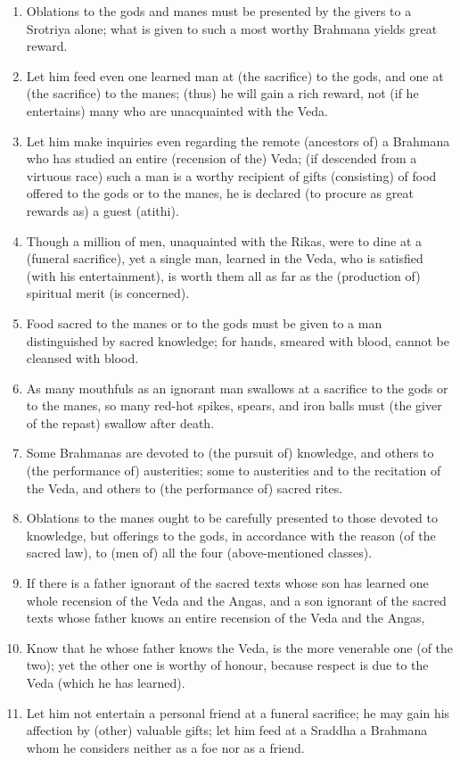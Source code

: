 \begin{enumerate}
\item Oblations to the gods and manes must be presented by the givers to a Srotriya alone; what is given to such a most worthy Brahmana yields great reward.
\item Let him feed even one learned man at (the sacrifice) to the gods, and one at (the sacrifice) to the manes; (thus) he will gain a rich reward, not (if he entertains) many who are unacquainted with the Veda.
\item Let him make inquiries even regarding the remote (ancestors of) a Brahmana who has studied an entire (recension of the) Veda; (if descended from a virtuous race) such a man is a worthy recipient of gifts (consisting) of food offered to the gods or to the manes, he is declared (to procure as great rewards as) a guest (atithi).
\item Though a million of men, unaquainted with the Rikas, were to dine at a (funeral sacrifice), yet a single man, learned in the Veda, who is satisfied (with his entertainment), is worth them all as far as the (production of) spiritual merit (is concerned).
\item Food sacred to the manes or to the gods must be given to a man distinguished by sacred knowledge; for hands, smeared with blood, cannot be cleansed with blood.
\item As many mouthfuls as an ignorant man swallows at a sacrifice to the gods or to the manes, so many red-hot spikes, spears, and iron balls must (the giver of the repast) swallow after death.
\item Some Brahmanas are devoted to (the pursuit of) knowledge, and others to (the performance of) austerities; some to austerities and to the recitation of the Veda, and others to (the performance of) sacred rites.
\item Oblations to the manes ought to be carefully presented to those devoted to knowledge, but offerings to the gods, in accordance with the reason (of the sacred law), to (men of) all the four (above-mentioned classes).
\item If there is a father ignorant of the sacred texts whose son has learned one whole recension of the Veda and the Angas, and a son ignorant of the sacred texts whose father knows an entire recension of the Veda and the Angas,
\item Know that he whose father knows the Veda, is the more venerable one (of the two); yet the other one is worthy of honour, because respect is due to the Veda (which he has learned).
\item Let him not entertain a personal friend at a funeral sacrifice; he may gain his affection by (other) valuable gifts; let him feed at a Sraddha a Brahmana whom he considers neither as a foe nor as a friend.

\end{enumerate}
